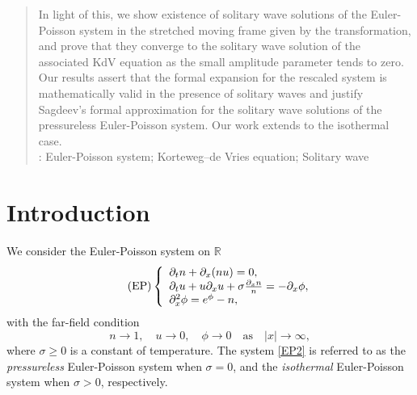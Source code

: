 \documentclass{amsart}
\newcommand{\veps}{\varepsilon}
\numberwithin{equation}{section}
\theoremstyle{plain}%
\theoremstyle{definition}
\theoremstyle{remark}
\theoremstyle{remark}
\begin{document}
\begin{abstract}
In light of this, we show existence of solitary wave solutions of the Euler-Poisson system in the stretched moving frame given by the transformation, and prove that they converge to the solitary wave solution of the associated KdV equation as the small amplitude parameter tends to zero. 
Our results assert that the formal expansion for the rescaled system is mathematically valid in the presence of solitary waves and justify Sagdeev's formal approximation for the solitary wave solutions of the pressureless Euler-Poisson system. Our work extends to the isothermal case.\\

:
Euler-Poisson system; Korteweg–de Vries equation; Solitary wave
\end{abstract}

\section{Introduction}
We consider the Euler-Poisson system on $\mathbb{R}$
\begin{equation}\tag{EP}\label{EP2}
\left\{
\begin{array}{l l}
\partial_{t} n + \partial_{x}(nu) = 0, \\ 
\partial_{t} u  + u\partial_{x} u + \sigma\frac{\partial_{x} n}{n} = -\partial_{x}\phi, \\
\partial_{x}^2\phi = e^\phi - n,
\end{array} 
\right.
\end{equation}
with the far-field condition
\begin{equation}\tag{BC}\label{bdCon x}
n \to 1, \quad u \to 0, \quad \phi \to 0 \quad \text{as} \quad |x| \to \infty,
\end{equation}
where $\sigma \geq 0$ is a constant of temperature. The system  \eqref{EP2} is referred to as the  \textit{pressureless} Euler-Poisson system when $\sigma=0$, and the \textit{isothermal} Euler-Poisson system when $\sigma >0$, respectively.  %
\end{document}
